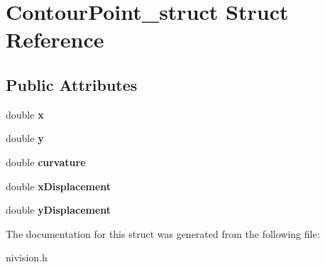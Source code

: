 \hypertarget{structContourPoint__struct}{
\section{ContourPoint\_\-struct Struct Reference}
\label{structContourPoint__struct}
}
\subsection*{Public Attributes}
\begin{DoxyCompactItemize}
\item 
\hypertarget{structContourPoint__struct_a207e465f5d540c2583a92b88c0e9db06}{
double {\bfseries x}}
\label{structContourPoint__struct_a207e465f5d540c2583a92b88c0e9db06}

\item 
\hypertarget{structContourPoint__struct_a97e2a57f6af6ef540f0b32936d67db84}{
double {\bfseries y}}
\label{structContourPoint__struct_a97e2a57f6af6ef540f0b32936d67db84}

\item 
\hypertarget{structContourPoint__struct_a7a03ee976e25bea70c3ad25cf6d5c250}{
double {\bfseries curvature}}
\label{structContourPoint__struct_a7a03ee976e25bea70c3ad25cf6d5c250}

\item 
\hypertarget{structContourPoint__struct_aa1ae63419763b8ed3753ed924861750a}{
double {\bfseries xDisplacement}}
\label{structContourPoint__struct_aa1ae63419763b8ed3753ed924861750a}

\item 
\hypertarget{structContourPoint__struct_a3482b1c9033dc6a5309b39837485cc20}{
double {\bfseries yDisplacement}}
\label{structContourPoint__struct_a3482b1c9033dc6a5309b39837485cc20}

\end{DoxyCompactItemize}


The documentation for this struct was generated from the following file:\begin{DoxyCompactItemize}
\item 
nivision.h\end{DoxyCompactItemize}
